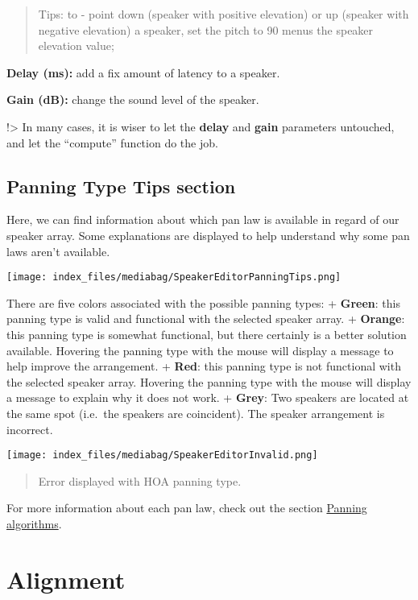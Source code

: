 \documentclass[
  letterpaper,
  DIV=11,
  numbers=noendperiod]{scrreport}
\begin{document}
\begin{quote}
Tips: to - point down (speaker with positive elevation) or up (speaker
with negative elevation) a speaker, set the pitch to 90 menus the
speaker elevation value;
\end{quote}

\textbf{Delay (ms):} add a fix amount of latency to a speaker.

\textbf{Gain (dB):} change the sound level of the speaker.

!\textgreater{} In many cases, it is wiser to let the \textbf{delay} and
\textbf{gain} parameters untouched, and let the ``compute'' function do
the job.

\hypertarget{panning-type-tips-section}{%
\subsection{Panning Type Tips section}\label{panning-type-tips-section}}

Here, we can find information about which pan law is available in regard
of our speaker array. Some explanations are displayed to help understand
why some pan laws aren't available.

\texttt{[image: index\_files/mediabag/SpeakerEditorPanningTips.png]}

There are five colors associated with the possible panning types: +
\textbf{Green}: this panning type is valid and functional with the
selected speaker array. + \textbf{Orange}: this panning type is somewhat
functional, but there certainly is a better solution available. Hovering
the panning type with the mouse will display a message to help improve
the arrangement. + \textbf{Red}: this panning type is not functional
with the selected speaker array. Hovering the panning type with the
mouse will display a message to explain why it does not work. +
\textbf{Grey}: Two speakers are located at the same spot (i.e.~the
speakers are coincident). The speaker arrangement is incorrect.

\texttt{[image: index\_files/mediabag/SpeakerEditorInvalid.png]}

\begin{quote}
Error displayed with HOA panning type.
\end{quote}

For more information about each pan law, check out the section
\href{Spatialisation_Technology_Panning_Algorithms.md}{Panning
algorithms}.

\hypertarget{spkrArr-editor-alignment}{%
\section{Alignment}\label{spkrArr-editor-alignment}}
\end{document}
